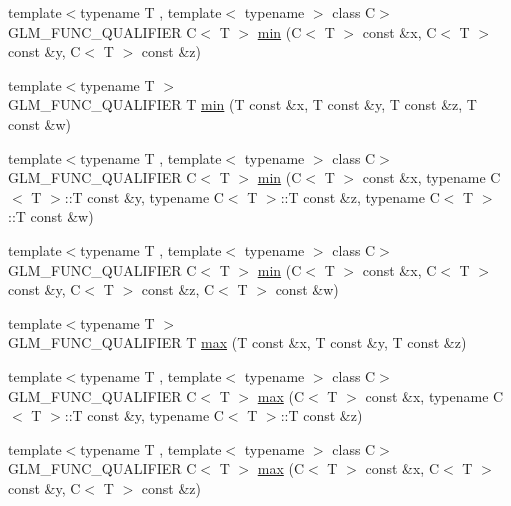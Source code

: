 \begin{DoxyCompactItemize}
\item 
{\footnotesize template$<$typename T , template$<$ typename $>$ class C$>$ }\\G\-L\-M\-\_\-\-F\-U\-N\-C\-\_\-\-Q\-U\-A\-L\-I\-F\-I\-E\-R C$<$ T $>$ \hyperlink{group__gtx__extented__min__max_ga42b5c3fc027fd3d9a50d2ccc9126d9f0}{min} (C$<$ T $>$ const \&x, C$<$ T $>$ const \&y, C$<$ T $>$ const \&z)
\item 
{\footnotesize template$<$typename T $>$ }\\G\-L\-M\-\_\-\-F\-U\-N\-C\-\_\-\-Q\-U\-A\-L\-I\-F\-I\-E\-R T \hyperlink{group__gtx__extented__min__max_ga95466987024d03039607f09e69813d69}{min} (T const \&x, T const \&y, T const \&z, T const \&w)
\item 
{\footnotesize template$<$typename T , template$<$ typename $>$ class C$>$ }\\G\-L\-M\-\_\-\-F\-U\-N\-C\-\_\-\-Q\-U\-A\-L\-I\-F\-I\-E\-R C$<$ T $>$ \hyperlink{group__gtx__extented__min__max_ga4fe35dd31dd0c45693c9b60b830b8d47}{min} (C$<$ T $>$ const \&x, typename C$<$ T $>$\-::T const \&y, typename C$<$ T $>$\-::T const \&z, typename C$<$ T $>$\-::T const \&w)
\item 
{\footnotesize template$<$typename T , template$<$ typename $>$ class C$>$ }\\G\-L\-M\-\_\-\-F\-U\-N\-C\-\_\-\-Q\-U\-A\-L\-I\-F\-I\-E\-R C$<$ T $>$ \hyperlink{group__gtx__extented__min__max_ga7471ea4159eed8dd9ea4ac5d46c2fead}{min} (C$<$ T $>$ const \&x, C$<$ T $>$ const \&y, C$<$ T $>$ const \&z, C$<$ T $>$ const \&w)
\item 
{\footnotesize template$<$typename T $>$ }\\G\-L\-M\-\_\-\-F\-U\-N\-C\-\_\-\-Q\-U\-A\-L\-I\-F\-I\-E\-R T \hyperlink{group__gtx__extented__min__max_ga04991ccb9865c4c4e58488cfb209ce69}{max} (T const \&x, T const \&y, T const \&z)
\item 
{\footnotesize template$<$typename T , template$<$ typename $>$ class C$>$ }\\G\-L\-M\-\_\-\-F\-U\-N\-C\-\_\-\-Q\-U\-A\-L\-I\-F\-I\-E\-R C$<$ T $>$ \hyperlink{group__gtx__extented__min__max_gae1b7bbe5c91de4924835ea3e14530744}{max} (C$<$ T $>$ const \&x, typename C$<$ T $>$\-::T const \&y, typename C$<$ T $>$\-::T const \&z)
\item 
{\footnotesize template$<$typename T , template$<$ typename $>$ class C$>$ }\\G\-L\-M\-\_\-\-F\-U\-N\-C\-\_\-\-Q\-U\-A\-L\-I\-F\-I\-E\-R C$<$ T $>$ \hyperlink{group__gtx__extented__min__max_gaf832e9d4ab4826b2dda2fda25935a3a4}{max} (C$<$ T $>$ const \&x, C$<$ T $>$ const \&y, C$<$ T $>$ const \&z)

\end{DoxyCompactItemize}
